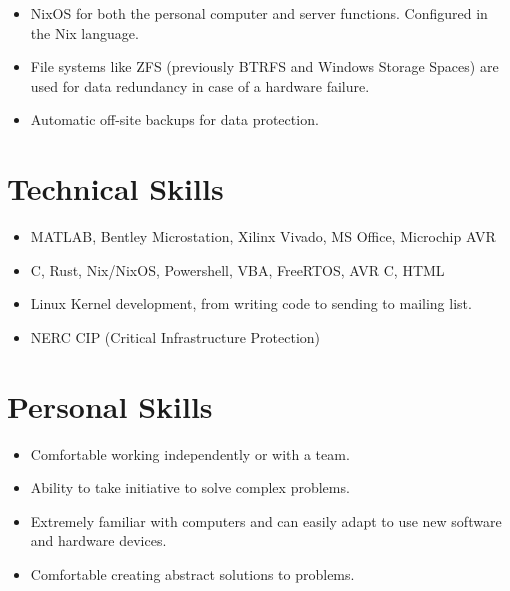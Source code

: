 \documentclass{lsanche_cv}
\begin{document}
\begin{multicols}{2}
    \divider

      \begin{itemize}
        \item NixOS for both the personal computer and server functions. Configured in the Nix language.
				\item File systems like ZFS (previously BTRFS and Windows Storage Spaces) are used for data redundancy in case of a hardware failure.
				\item Automatic off-site backups for data protection.
      \end{itemize}

    \section{Technical Skills}
      \begin{itemize}
        \item MATLAB, Bentley Microstation, Xilinx Vivado, MS Office, Microchip AVR
        \item C, Rust, Nix/NixOS, Powershell, VBA, FreeRTOS, AVR C, HTML
        \item Linux Kernel development, from writing code to sending to mailing list.
        \item NERC CIP (Critical Infrastructure Protection)
      \end{itemize}
    
    \section{Personal Skills}
      \begin{itemize}
        \item Comfortable working independently or with a team.
        \item Ability to take initiative to solve complex problems.
        \item Extremely familiar with computers and can easily adapt to use new software and hardware devices.
				\item Comfortable creating abstract solutions to problems.
      \end{itemize}
\end{multicols}
\end{document}
